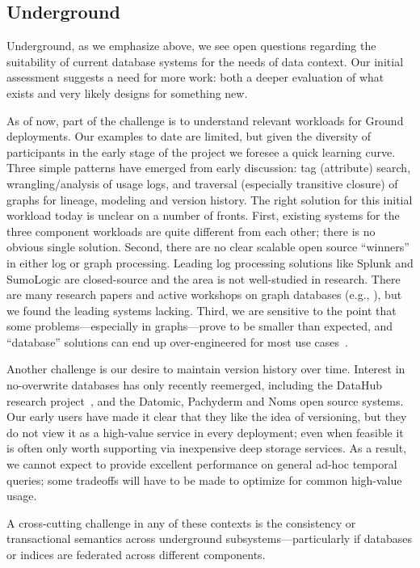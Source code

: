 \documentclass{sig-alternate}
\begin{document}
\subsection{Underground}
Underground, as we emphasize above, we see open questions regarding the suitability of current database systems for the needs of data context. Our initial assessment suggests a need for more work: both a deeper evaluation of what exists and very likely designs for something new. 

As of now, part of the challenge is to understand relevant workloads for Ground deployments.  Our examples to date are limited, but given the diversity of participants in the early stage of the project we foresee a quick learning curve. Three simple patterns have emerged from early discussion: tag (attribute) search, wrangling/analysis of usage logs, and traversal (especially transitive closure) of graphs for lineage, modeling and version history. The right solution for this initial workload today is unclear on a number of fronts. First, existing systems for the three component workloads are quite different from each other; there is no obvious single solution. Second, there are no clear scalable open source ``winners'' in either log or graph processing. Leading log processing solutions like Splunk and SumoLogic are closed-source and the area is not well-studied in research. There are many research papers and active workshops on graph databases (e.g., \cite{grades16}), but we found the leading systems lacking.  Third, we are sensitive to the point that some problems---especially in graphs---prove to be smaller than expected, and ``database'' solutions can end up over-engineered for most use cases~\cite{mcsherry}. 

Another challenge is our desire to maintain version history over time. Interest in no-overwrite databases has only recently reemerged, including the DataHub research project~\cite{datahub}, and the Datomic, Pachyderm and Noms open source systems. Our early users have made it clear that they like the idea of versioning, but they do not view it as a high-value service in every deployment; even when feasible it is often only worth supporting via inexpensive deep storage services. As a result, we cannot expect to provide excellent performance on general ad-hoc temporal queries; some tradeoffs will have to be made to optimize for common high-value usage.  

A cross-cutting challenge in any of these contexts is the consistency or transactional semantics across underground subsystems---particularly if databases or indices are federated across different components.
\end{document}
